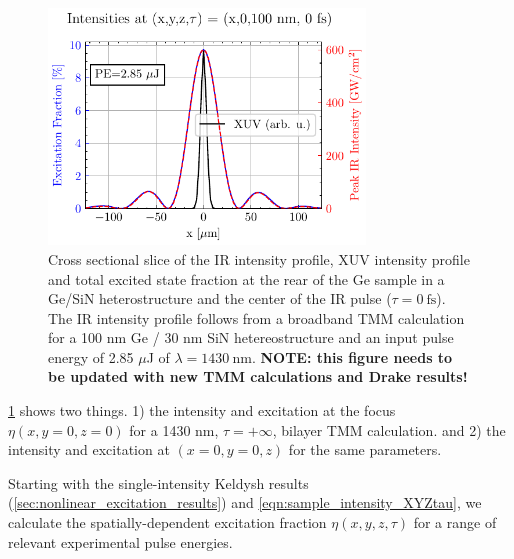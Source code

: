 \begin{figure}
	\centering
	\includegraphics[width=0.75\textwidth]{figures/chap4/excitation_at_focus.pdf}
	\caption{Cross sectional slice of the IR intensity profile, XUV intensity profile and total excited state fraction at the rear of the Ge sample in a Ge/SiN heterostructure and the center of the IR pulse ($\tau = 0 \ \textrm{fs}$). The IR intensity profile follows from a broadband TMM calculation for a 100 nm Ge / 30 nm SiN hetereostructure and an input pulse energy of 2.85 $\mu$J of $\lambda = 1430 \ \textrm{nm}$. \textbf{NOTE: this figure needs to be updated with new TMM calculations and Drake results!}}
	\label{fig:excitation_at_focus}
\end{figure}

\cref{fig:excitation_at_focus} shows two things. 1) the intensity and excitation at the focus $\eta(x,y=0,z=0)$ for a 1430 nm, $\tau = +\infty$, bilayer TMM calculation. and 2) the intensity and excitation at $(x=0,y=0,z)$ for the same parameters.

Starting with the single-intensity Keldysh results (\cref{sec:nonlinear_excitation_results}) and \cref{eqn:sample_intensity_XYZtau}, we calculate the spatially-dependent excitation fraction $\eta(x,y,z,\tau)$ for a range of relevant experimental pulse energies.




